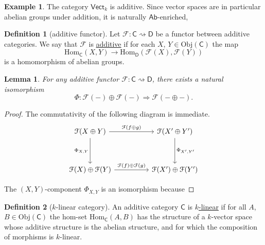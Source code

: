 \documentclass[a4paper]{report}
\newcommand{\defn}[1]{\ul{#1}}
\newcommand{\Obj}{\mathrm{Obj}}
\newcommand{\Hom}{\mathrm{Hom}}
\theoremstyle{definition}
\newtheorem{definition}{Definition}[section]
\newtheorem{example}{Example}[section]
\theoremstyle{plain}
\newtheorem{lemma}{Lemma}[section]
\theoremstyle{remark}
\begin{document}
\begin{example}
  The category $\mathsf{Vect}_{k}$ is additive. Since vector spaces are in particular abelian groups under addition, it is naturally $\mathsf{Ab}$-enriched,
\end{example}

\begin{definition}[additive functor]
  \label{def:additivefunctor}
  Let $\mathcal{F}\colon \mathsf{C} \rightsquigarrow \mathsf{D}$ be a functor between additive categories. We say that $\mathcal{F}$ is \defn{additive} if for each $X$, $Y \in \Obj(\mathsf{C})$ the map
  \begin{equation*}
    \Hom_{\mathsf{C}}(X, Y) \to \Hom_{\mathsf{D}}(\mathcal{F}(X), \mathcal{F}(Y))
  \end{equation*}
  is a homomorphism of abelian groups.
\end{definition}

\begin{lemma}
  For any additive functor $\mathcal{F}\colon \mathsf{C} \rightsquigarrow \mathsf{D}$, there exists a natural isomorphism 
  \begin{equation*}
    \Phi\colon \mathcal{F}(-) \oplus \mathcal{F}(-) \Rightarrow \mathcal{F}(- \oplus -).
  \end{equation*}
\end{lemma}
\begin{proof}
  The commutativity of the following diagram is immediate.
  \begin{equation*}
    \begin{tikzcd}[column sep=huge, row sep=huge]
      \mathcal{F}(X \oplus Y)
      \arrow[r, "\mathcal{F}(f \oplus g)"]
      \arrow[d, swap, "\Phi_{X, Y}"]
      & \mathcal{F}(X' \oplus Y')
      \arrow[d, "\Phi_{X', Y'}"]
      \\
      \mathcal{F}(X) \oplus \mathcal{F}(Y)
      \arrow[r, "\mathcal{F}(f) \oplus \mathcal{F}(g)"]
      & \mathcal{F}(X') \oplus \mathcal{F}(Y')
    \end{tikzcd}
  \end{equation*}

  The $(X, Y)$-component $\Phi_{X, Y}$ is an isomorphism because
\end{proof}

\begin{definition}[$k$-linear category]
  \label{def:linearcategory}
  An additive category $\mathsf{C}$ is \defn{$k$-linear} if for all $A$, $B \in \Obj(\mathsf{C})$ the hom-set $\Hom_{\mathsf{C}}(A, B)$ has the structure of a $k$-vector space whose additive structure is the abelian structure, and for which the composition of morphisms is $k$-linear.
\end{definition}
\end{document}
